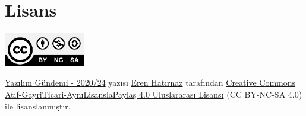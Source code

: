 \documentclass[11pt]{article}
\begin{document}
\section{Lisans}
\label{sec:org5684c08}
\begin{center}
\begin{center}
\includegraphics[height=1.5cm]{../../../img/CC_BY-NC-SA_4.0.png}
\end{center}

\href{yazilim-gundemi-2020-24.pdf}{Yazılım Gündemi - 2020/24} yazısı \href{https://erenhatirnaz.github.io}{Eren Hatırnaz} tarafından \href{http://creativecommons.org/licenses/by-nc-sa/4.0/}{Creative Commons
Atıf-GayriTicari-AynıLisanslaPaylaş 4.0 Uluslararası Lisansı} (CC BY-NC-SA 4.0)
ile lisanslanmıştır.
\end{center}
\end{document}
